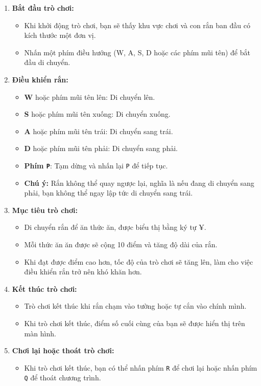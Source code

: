 \documentclass[12pt]{report}
\begin{document}
\begin{enumerate}[label=\arabic*.]
    \item \textbf{Bắt đầu trò chơi:}
    \begin{itemize}
        \item Khi khởi động trò chơi, bạn sẽ thấy khu vực chơi và con rắn ban đầu có kích thước một đơn vị.
        \item Nhấn một phím điều hướng (W, A, S, D hoặc các phím mũi tên) để bắt đầu di chuyển.
    \end{itemize}
    
    \item \textbf{Điều khiển rắn:}
    \begin{itemize}
        \item \textbf{W} hoặc phím mũi tên lên: Di chuyển lên.
        \item \textbf{S} hoặc phím mũi tên xuống: Di chuyển xuống.
        \item \textbf{A} hoặc phím mũi tên trái: Di chuyển sang trái.
        \item \textbf{D} hoặc phím mũi tên phải: Di chuyển sang phải.
        \item \textbf{Phím \texttt{P}}: Tạm dừng và nhấn lại \texttt{P} để tiếp tục.
        \item \textbf{Chú ý:} Rắn không thể quay ngược lại, nghĩa là nếu đang di chuyển sang phải, bạn không thể ngay lập tức di chuyển sang trái.
    \end{itemize}
    
    \item \textbf{Mục tiêu trò chơi:}
    \begin{itemize}
         \item Di chuyển rắn để ăn thức ăn, được biểu thị bằng ký tự ¥.
        \item Mỗi thức ăn ăn được sẽ cộng 10 điểm và tăng độ dài của rắn.
        \item Khi đạt được điểm cao hơn, tốc độ của trò chơi sẽ tăng lên, làm cho việc điều khiển rắn trở nên khó khăn hơn.
    \end{itemize}
        \item \textbf{Kết thúc trò chơi:}
    \begin{itemize}
        \item Trò chơi kết thúc khi rắn chạm vào tường hoặc tự cắn vào chính mình.
        \item Khi trò chơi kết thúc, điểm số cuối cùng của bạn sẽ được hiển thị trên màn hình.
    \end{itemize}
    
    \item \textbf{Chơi lại hoặc thoát trò chơi:}
    \begin{itemize}
        \item Khi trò chơi kết thúc, bạn có thể nhấn phím \texttt{R} để chơi lại hoặc nhấn phím \texttt{Q} để thoát chương trình.
    \end{itemize}
\end{enumerate}
\end{document}
